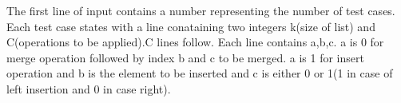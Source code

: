 The first line of input contains a number representing the number of test cases. Each test case states with a line conataining two integers k(size of list) and C(operations to be applied).C lines follow. Each line contains a,b,c. a is 0 for merge operation followed by index b and c to be merged. a is 1 for insert operation and b is the element to be inserted and c is either 0 or 1(1 in case of left insertion and 0 in case right).